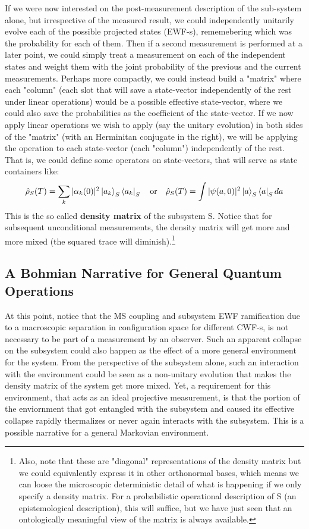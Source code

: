 \documentclass[11pt, a4paper]{article} %
\begin{document}
If we were now interested on the post-measurement description of the sub-system alone, but irrespective of the measured result, we could independently unitarily evolve each of the possible projected states (EWF-s), rememebering which was the probability for each of them. Then if a second measurement is performed at a later point, we could simply treat a measurement on each of the independent states and weight them with the joint probability of the previous and the current measurements. Perhaps more compactly, we could instead build a "matrix" where each "column" (each slot that will save a state-vector independently of the rest under linear operations) would be a possible effective state-vector, where we could also save the probabilities as the coefficient of the state-vector. If we now apply linear operations we wish to apply (say the unitary evolution) in both sides of the "matrix" (with an Herminitan conjugate in the right), we will be applying the operation to each state-vector (each "column") independently of the rest. That is, we could define some operators on state-vectors, that will serve as state containers like:
\begin{equation}\label{dens}
\hat{\rho}_S(T) =\sum_k |\alpha_k(0)|^2\ket{a_k}_S\bra{a_k}_S \quad \text{or} \quad \hat{\rho}_S(T)=\int |\psi(a,0)|^2\ket{a}_S\bra{a}_S da
\end{equation}
This is the so called {\bf density matrix} of the subsystem S. Notice that for subsequent unconditional measurements, the density matrix will get more and more mixed (the squared trace will diminish).\footnote{Also, note that these are "diagonal" representations of the density matrix but we could equivalently express it in other orthonormal bases, which means we can loose the microscopic deterministic detail of what is happening if we only specify a density matrix. For a probabilistic operational description of S (an epistemological description), this will suffice, but we have just seen that an ontologically meaningful view of the matrix is always available.}

\subsection*{A Bohmian Narrative for General Quantum Operations}
At this point, notice that the MS coupling and subsystem EWF ramification due to a macroscopic separation in configuration space for different CWF-s, is not necessary to be part of a measurement by an observer. Such an apparent collapse on the subsystem could also happen as the effect of a more general environment for the system. From the perspective of the subsystem alone, such an interaction with the environment could be seen as a non-unitary evolution that makes the density matrix of the system get more mixed. Yet, a requirement for this environment, that acts as an ideal projective measurement, is that the portion of the enviornment that got entangled with the subsystem and caused its effective collapse rapidly thermalizes or never again interacts with the subsystem. This is a possible narrative for a general Markovian environment.
\end{document}
